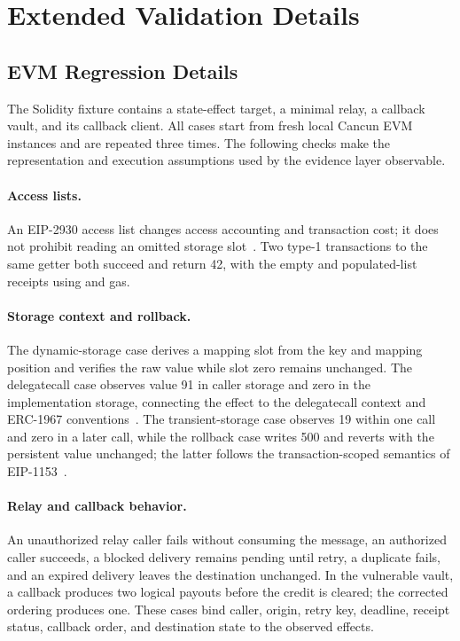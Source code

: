 \section{Extended Validation Details}
\label{app:extended-details}

\subsection{EVM Regression Details}
The Solidity fixture contains a state-effect target, a minimal relay, a
callback vault, and its callback client. All cases start from fresh local
Cancun EVM instances and are repeated three times. The following checks make
the representation and execution assumptions used by the evidence layer
observable.

\paragraph{Access lists.}
An EIP-2930 access list changes access accounting and transaction cost; it does
not prohibit reading an omitted storage slot~\cite{eip2930}. Two type-1
transactions to the same getter both succeed and return 42, with the empty
and populated-list receipts using \EmptyListGas{} and \PopulatedListGas{} gas.

\paragraph{Storage context and rollback.}
The dynamic-storage case derives a mapping slot from the key and mapping
position and verifies the raw value while slot zero remains unchanged. The
delegatecall case observes value 91 in caller storage and zero in the
implementation storage, connecting the effect to the delegatecall context
and ERC-1967 conventions~\cite{erc1967}. The transient-storage case observes
19 within one call and zero in a later call, while the rollback case writes
500 and reverts with the persistent value unchanged; the latter follows the
transaction-scoped semantics of EIP-1153~\cite{eip1153}.

\paragraph{Relay and callback behavior.}
An unauthorized relay caller fails without consuming the message, an
authorized caller succeeds, a blocked delivery remains pending until retry,
a duplicate fails, and an expired delivery leaves the destination unchanged.
In the vulnerable vault, a callback produces two logical payouts before the
credit is cleared; the corrected ordering produces one. These cases bind
caller, origin, retry key, deadline, receipt status, callback order, and
destination state to the observed effects.

